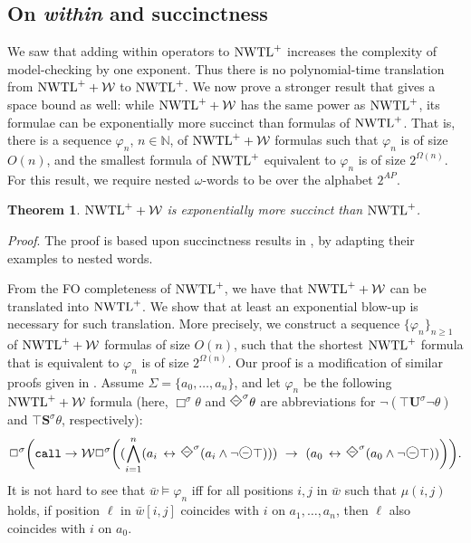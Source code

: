 \documentclass{LMCS}
\newcommand{\M}{{\mu}}
\newcommand{\w}{{\bar{w}}}
\newcommand{\dm}{\Diamond}
\newcommand{\WW}{{\mathcal{W}}}
\newcommand{\U}{{\mathbf U}}
\renewcommand{\S}{{\mathbf S}}
\newcommand{\next}{\text{\raisebox{1pt}{$\bigcirc$}}}
\renewcommand{\phi}{\varphi}
\theoremstyle{plain}
\newtheorem{theorem}{Theorem}[section]
\theoremstyle{definition}
\newcommand{\ppath}{\sigma} \newcommand{\Ul}{\U}
\newcommand{\Up}{\U^\ppath}
\newcommand{\Sp}{\S^\ppath}
\newcommand{\always}{\Box}
\newcommand{\prev}{{\text{\Large $\mathbf{\circleddash}$}}}
\newcommand{\dmd}{{\qbezier(0,0)(0.5,0.5)(1,1) \qbezier(0,0)(-0.5,0.5)(-1,1)
    \qbezier(0,2)(0.5,1.5)(1,1) \qbezier(0,2)(-0.5,1.5)(-1,1)}}
\newcommand{\dmdminus}{{\unitlength1.5mm
    \begin{picture}(2.2,2)(-1,0)
      \dmd \put(-0.5,1){\line(1,0){1}}
    \end{picture}}}
\newcommand{\peventually}{\dmdminus}
\newcommand{\nwtlp}{\nwtl^+}
\newcommand{\call}{{\tt call}}
\newcommand{\dmminus}{\dm^-}
\renewcommand{\dm}{\next}
\renewcommand{\dmminus}{\prev}
\newcommand{\nn}{{\mathbb N}}
\newcounter{example}
\begin{document}
\subsection{On {\em within} and succinctness} We saw that adding
within operators to $\nwtlp$ increases the complexity of
model-checking by one exponent. Thus there is no
polynomial-time translation from $\nwtlp + \WW$ to $\nwtlp$. We now
prove a stronger result that gives a space bound as well: while
$\nwtlp+\WW$ has the same power as $\nwtlp$, its formulae can be
exponentially more succinct than formulas of $\nwtlp$. That is, there
is a sequence $\phi_n$, $n\in\nn$, of $\nwtlp+\WW$ formulas such that
$\phi_n$ is of size $O(n)$, and the smallest formula of $\nwtlp$
equivalent to $\phi_n$ is of size $2^{\Omega(n)}$.  For this result,
we require nested $\omega$-words to be over the alphabet $2^{AP}$.


\begin{theorem}\label{succinct-theo}
$\nwtlp + \WW$ is exponentially more succinct than $\nwtlp$.
\end{theorem}

{\em Proof}. 
The proof is based upon succinctness results in \cite{EVW02,LMS}, by
adapting their examples to nested words. 

From the FO completeness of $\nwtlp$, we have that $\nwtlp + \WW$ can be
translated into $\nwtlp$. We show that at least an exponential blow-up
is necessary for such translation. More precisely, we construct a
sequence $\{\phi_n\}_{n \geq 1}$ of $\nwtlp + \WW$ formulas of size
$O(n)$, such that the shortest $\nwtlp$ formula that is equivalent to
$\phi_n$ is of size $2^{\Omega(n)}$. Our proof is a modification of
similar proofs given in \cite{EVW02,LMS}.  Assume $\Sigma =
\{a_0,\dots,a_n\}$, and let $\phi_n$ be the following $\nwtlp + \WW$
formula (here, $\always^\ppath \theta$ and $\peventually^\ppath \theta$ are
abbreviations for $\neg (\top \Up \neg \theta)$ and $\top \Sp \theta$,
respectively):
\begin{eqnarray*}
\always^\ppath \bigg(\call \to \WW \always^\ppath \bigg((\bigwedge_{i
=1}^n (a_i \, \leftrightarrow \, \peventually^\ppath(a_i \wedge \neg
\dmminus \top))) \ \rightarrow \ (a_0 \, \leftrightarrow \,
\peventually^\ppath (a_0 \wedge \neg \dmminus \top))\bigg)\bigg).
\end{eqnarray*}
It is not hard to see that $\w \models \phi_n$ iff for all positions
$i,j$ in $\w$ such that $\M(i,j)$ holds, if position $\ell$ in
$\w[i,j]$ coincides with $i$ on $a_1,\dots,a_n$, then $\ell$ also
coincides with $i$ on $a_0$.
\end{document}
